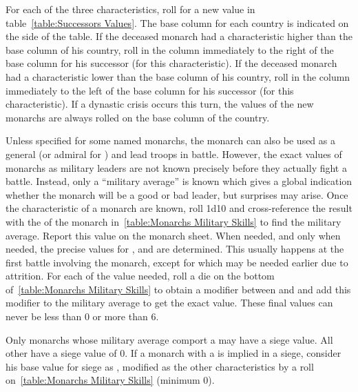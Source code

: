 
\aparag[Characteristics] For each of the three characteristics, roll for
a new value in table~\ref{table:Successors Values}.
\bparag The base column for each country is indicated on the side of the
table.
\bparag If the deceased monarch had a characteristic higher than the
base column of his country, roll in the column immediately to the right
of the base column for his successor (for this characteristic).
\bparag If the deceased monarch had a characteristic lower than the base
column of his country, roll in the column immediately to the left of the
base column for his successor (for this characteristic).
\bparag If a dynastic crisis occurs this turn, the values of the new
monarchs are always rolled on the base column of the country.

 Unless specified for some named monarchs, the
monarch can also be used as a general (or admiral for \VEN) and lead
troops in battle. However, the exact values of monarchs as military
leaders are not known precisely before they actually fight a
battle. Instead, only a ``military average'' is known which gives a
global indication whether the monarch will be a good or bad leader, but
surprises may arise.
\bparag Once the characteristic of a monarch are known, roll 1d10 and
cross-reference the result with the \MIL of the monarch
in~\ref{table:Monarchs Military Skills} to find the military
average. Report this value on the monarch sheet.
\bparag When needed, and only when needed, the precise values for
,  and  are determined. This
usually happens at the first battle involving the monarch, except for
 which may be needed earlier due to attrition.
\bparag For each of the value needed, roll a die on the bottom
of~\ref{table:Monarchs Military Skills} to obtain a modifier between
 and  and add this modifier to the military average
to get the exact value.
\bparag These final values can never be less than 0 or more than 6.

\aparag[Siege] Only monarchs whose military average comport a
\textetoile may have a siege value. All other have a siege value of 0.
\bparag If a monarch with a \textetoile is implied in a siege, consider
his base value for siege as , modified as the other
characteristics by a roll on~\ref{table:Monarchs Military Skills}
(minimum 0).

